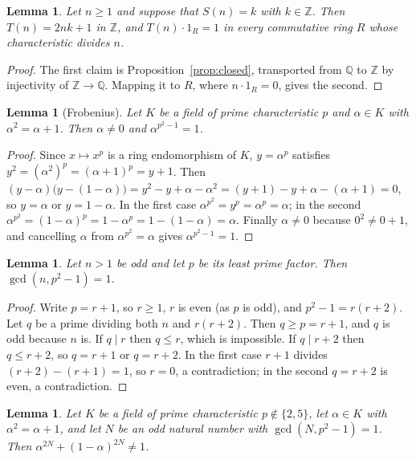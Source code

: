 \documentclass[11pt]{amsart}
\theoremstyle{plain}
\newtheorem{lemma}[theorem]{Lemma}
\theoremstyle{definition}
\newcommand{\Q}{\mathbb{Q}}
\newcommand{\Z}{\mathbb{Z}}
\begin{document}
\begin{lemma}\label{lem:reduce}
Let $n\ge1$ and suppose that $S(n)=k$ with $k\in\Z$. Then $T(n)=2nk+1$ in $\Z$, and $T(n)\cdot1_R=1$ in every commutative ring $R$ whose characteristic divides $n$.
\end{lemma}

\begin{proof}
The first claim is Proposition~\ref{prop:closed}, transported from $\Q$ to $\Z$ by injectivity of $\Z\to\Q$. Mapping it to $R$, where $n\cdot1_R=0$, gives the second.
\end{proof}

\begin{lemma}[Frobenius]\label{lem:frob}
Let $K$ be a field of prime characteristic $p$ and $\alpha\in K$ with $\alpha^2=\alpha+1$. Then $\alpha\ne0$ and $\alpha^{p^2-1}=1$.
\end{lemma}

\begin{proof}
Since $x\mapsto x^p$ is a ring endomorphism of $K$, $y=\alpha^p$ satisfies $y^2=(\alpha^2)^p=(\alpha+1)^p=y+1$.
Then $(y-\alpha)\bigl(y-(1-\alpha)\bigr)=y^2-y+\alpha-\alpha^2=(y+1)-y+\alpha-(\alpha+1)=0$, so $y=\alpha$ or $y=1-\alpha$.
In the first case $\alpha^{p^2}=y^p=\alpha^p=\alpha$; in the second $\alpha^{p^2}=(1-\alpha)^p=1-\alpha^p=1-(1-\alpha)=\alpha$.
Finally $\alpha\neq0$ because $0^2\ne0+1$, and cancelling $\alpha$ from $\alpha^{p^2}=\alpha$ gives $\alpha^{p^2-1}=1$.
\end{proof}

\begin{lemma}\label{lem:coprime}
Let $n>1$ be odd and let $p$ be its least prime factor. Then $\gcd(n,p^2-1)=1$.
\end{lemma}

\begin{proof}
Write $p=r+1$, so $r\ge1$, $r$ is even (as $p$ is odd), and $p^2-1=r(r+2)$.
Let $q$ be a prime dividing both $n$ and $r(r+2)$. Then $q\ge p=r+1$, and $q$ is odd because $n$ is.
If $q\mid r$ then $q\le r$, which is impossible.
If $q\mid r+2$ then $q\le r+2$, so $q=r+1$ or $q=r+2$.
In the first case $r+1$ divides $(r+2)-(r+1)=1$, so $r=0$, a contradiction; in the second $q=r+2$ is even, a contradiction.
\end{proof}

\begin{lemma}\label{lem:core}
Let $K$ be a field of prime characteristic $p\notin\{2,5\}$, let $\alpha\in K$ with $\alpha^2=\alpha+1$, and let $N$ be an odd natural number with $\gcd(N,p^2-1)=1$. Then $\alpha^{2N}+(1-\alpha)^{2N}\ne1$.
\end{lemma}
\end{document}
